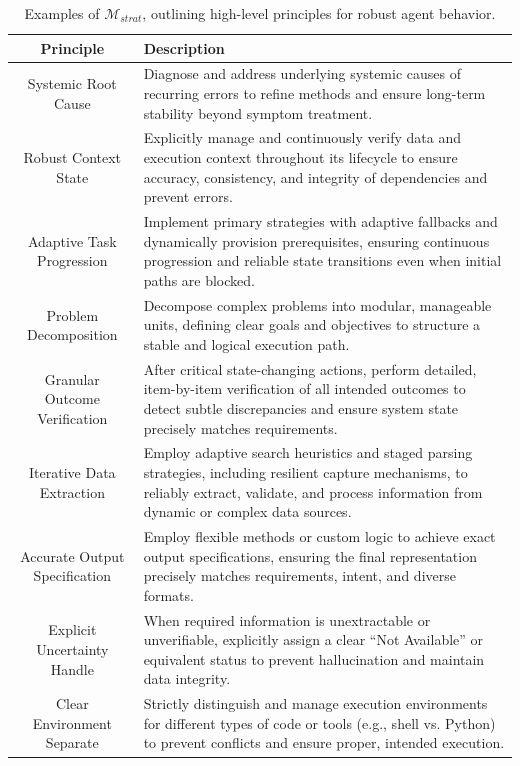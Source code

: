 \renewcommand{\arraystretch}{1.3}
\begin{table}[htbp]
\centering
\small
\caption{Examples of $\mathcal{M}_{strat}$, outlining high-level principles for robust agent behavior.}
\vspace{5pt}
\label{tab:strategic_memory}
\begin{tabular}{c|p{8cm}}
\toprule
\textbf{Principle} & \textbf{Description} \\
\midrule
Systemic Root Cause & Diagnose and address underlying systemic causes of recurring errors to refine methods and ensure long-term stability beyond symptom treatment. \\
Robust Context State & Explicitly manage and continuously verify data and execution context throughout its lifecycle to ensure accuracy, consistency, and integrity of dependencies and prevent errors. \\
Adaptive Task Progression & Implement primary strategies with adaptive fallbacks and dynamically provision prerequisites, ensuring continuous progression and reliable state transitions even when initial paths are blocked. \\
Problem Decomposition & Decompose complex problems into modular, manageable units, defining clear goals and objectives to structure a stable and logical execution path. \\
Granular Outcome Verification & After critical state-changing actions, perform detailed, item-by-item verification of all intended outcomes to detect subtle discrepancies and ensure system state precisely matches requirements. \\
Iterative Data Extraction & Employ adaptive search heuristics and staged parsing strategies, including resilient capture mechanisms, to reliably extract, validate, and process information from dynamic or complex data sources. \\
Accurate Output Specification & Employ flexible methods or custom logic to achieve exact output specifications, ensuring the final representation precisely matches requirements, intent, and diverse formats. \\
Explicit Uncertainty Handle & When required information is unextractable or unverifiable, explicitly assign a clear ``Not Available'' or equivalent status to prevent hallucination and maintain data integrity. \\
Clear Environment Separate & Strictly distinguish and manage execution environments for different types of code or tools (e.g., shell vs. Python) to prevent conflicts and ensure proper, intended execution. \\
\bottomrule
\end{tabular}
\end{table}

